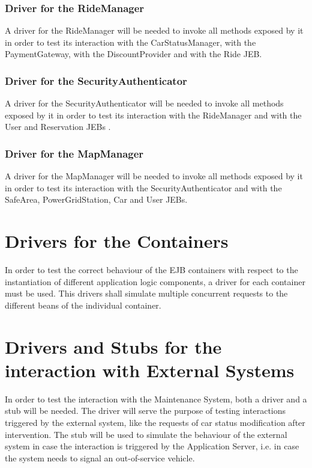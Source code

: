 \subsubsection{Driver for the RideManager}
A driver for the RideManager will be needed to invoke all methods exposed by it in order to test its interaction with the CarStatusManager, with the PaymentGateway, with the DiscountProvider and with the Ride JEB.

\subsubsection{Driver for the SecurityAuthenticator}
A driver for the SecurityAuthenticator will be needed to invoke all methods exposed by it in order to test its interaction with the RideManager and with the User and Reservation JEBs .

\subsubsection{Driver for the MapManager}
A driver for the MapManager will be needed to invoke all methods exposed by it in order to test its interaction with the SecurityAuthenticator and with the SafeArea, PowerGridStation, Car and User JEBs.

\section{Drivers for the Containers}
In order to test the correct behaviour of the EJB containers with respect to the instantiation of different application logic components, a driver for each container must be used. This drivers shall simulate multiple concurrent requests to the different beans of the individual container.

\section{Drivers and Stubs for the interaction with External Systems}
In order to test the interaction with the Maintenance System, both a driver and a stub will be needed.
\noindent
The driver will serve the purpose of testing interactions triggered by the external system, like the requests of car status modification after intervention.
\noindent
The stub will be used to simulate the behaviour of the external system in case the interaction is triggered by the Application Server, i.e. in case the system needs to signal an out-of-service vehicle.

